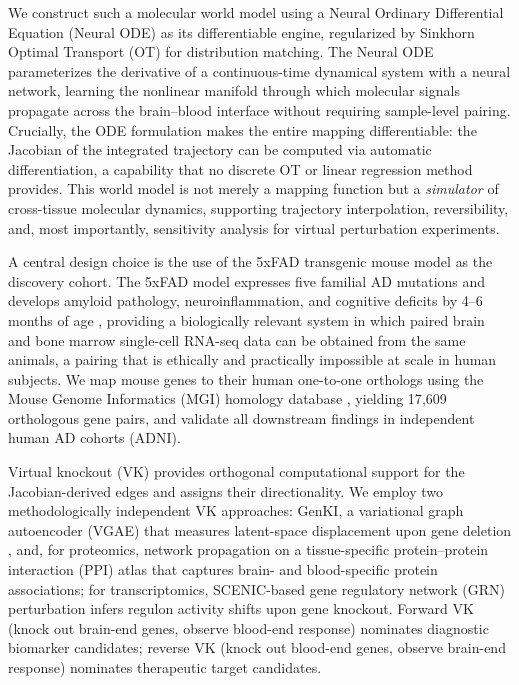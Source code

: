 \documentclass[12pt,a4paper]{article}
\begin{document}
We construct such a molecular world model using a Neural Ordinary Differential Equation (Neural ODE) \citep{chen2018} as its differentiable engine, regularized by Sinkhorn Optimal Transport (OT) \citep{cuturi2013} for distribution matching. The Neural ODE parameterizes the derivative of a continuous-time dynamical system with a neural network, learning the nonlinear manifold through which molecular signals propagate across the brain--blood interface without requiring sample-level pairing. Crucially, the ODE formulation makes the entire mapping differentiable: the Jacobian of the integrated trajectory can be computed via automatic differentiation, a capability that no discrete OT or linear regression method provides. This world model is not merely a mapping function but a \emph{simulator} of cross-tissue molecular dynamics, supporting trajectory interpolation, reversibility, and, most importantly, sensitivity analysis for virtual perturbation experiments.

A central design choice is the use of the 5xFAD transgenic mouse model \citep{oakley2006} as the discovery cohort. The 5xFAD model expresses five familial AD mutations and develops amyloid pathology, neuroinflammation, and cognitive deficits by 4--6 months of age \citep{jawhar2012}, providing a biologically relevant system in which paired brain and bone marrow single-cell RNA-seq data can be obtained from the same animals, a pairing that is ethically and practically impossible at scale in human subjects. We map mouse genes to their human one-to-one orthologs using the Mouse Genome Informatics (MGI) homology database \citep{eppig2015}, yielding 17{,}609 orthologous gene pairs, and validate all downstream findings in independent human AD cohorts (ADNI).

Virtual knockout (VK) provides orthogonal computational support for the Jacobian-derived edges and assigns their directionality. We employ two methodologically independent VK approaches: GenKI, a variational graph autoencoder (VGAE) that measures latent-space displacement upon gene deletion \citep{senuma2023}, and, for proteomics, network propagation on a tissue-specific protein--protein interaction (PPI) atlas \citep{lamantrip2025} that captures brain- and blood-specific protein associations; for transcriptomics, SCENIC-based gene regulatory network (GRN) perturbation \citep{aibar2017, moerman2019} infers regulon activity shifts upon gene knockout. Forward VK (knock out brain-end genes, observe blood-end response) nominates diagnostic biomarker candidates; reverse VK (knock out blood-end genes, observe brain-end response) nominates therapeutic target candidates.
\end{document}

